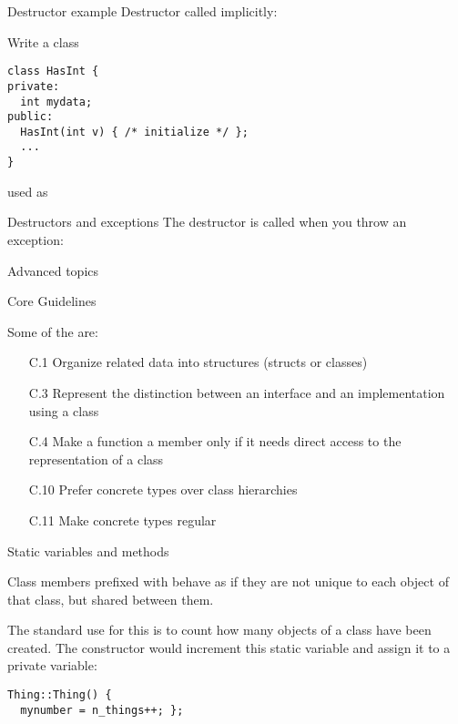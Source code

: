\begin{slide}{Destructor example}
  \label{sl:class-destruct-ex2}
  Destructor called implicitly:
\end{slide}

\begin{exercise}
  \label{ex:destruct-trace}
  Write a class
\begin{lstlisting}
class HasInt {
private:
  int mydata;
public:
  HasInt(int v) { /* initialize */ };
  ...
}
\end{lstlisting}
used as
%
\end{exercise}

\begin{block}{Destructors and exceptions}
  \label{sl:exceptobj}
  The destructor is called when you throw an exception:
\end{block}

 {Advanced topics}

 {Core Guidelines}

Some of the  are:

\begin{itemize}
\item[C.1] Organize related data into structures (structs or classes)
\item[C.3] Represent the distinction between an interface and an
  implementation using a class
\item[C.4] Make a function a member only if it needs direct access to the representation of a class
\item[C.10] Prefer concrete types over class hierarchies
\item[C.11] Make concrete types regular
\end{itemize}

 {Static variables and methods}
\label{sec:class-static}

Class members prefixed with  behave as if
they are not unique to each object of that class,
but shared between them.

The standard use for this is to count how many objects
of a class have been created.
The constructor would increment this static variable
and assign it to a private variable:
\begin{lstlisting}
Thing::Thing() {
  mynumber = n_things++; };
\end{lstlisting}

